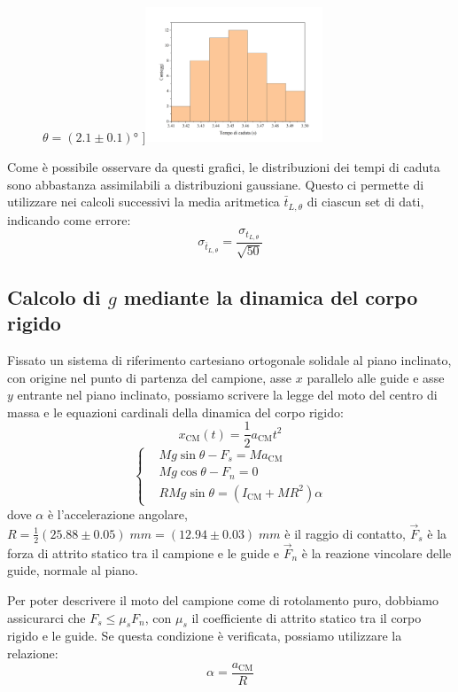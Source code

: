 \documentclass{article}
\begin{document}
\begin{figure}[H]
        $\theta=(2.1\pm0.1)\unit{\degree}$
    ]{\includegraphics[trim={2.1cm 0.7cm 2.1cm 2cm},clip,width=0.47\textwidth]{img/G8.jpg}}\hfil
\end{figure}

Come è possibile osservare da questi grafici, le distribuzioni dei tempi di caduta
sono abbastanza assimilabili a distribuzioni gaussiane.
Questo ci permette di utilizzare nei calcoli successivi la media aritmetica $\bar{t}_{L,\theta}$
di ciascun set di dati, indicando come errore:
\[\sigma_{\bar{t}_{L,\theta}} = \frac{\sigma_{t_{L,\theta}}}{\sqrt{50}}\]

\subsection{Calcolo di $g$ mediante la dinamica del corpo rigido}

Fissato un sistema di riferimento cartesiano ortogonale solidale
al piano inclinato, con origine nel punto di partenza del campione,
asse $x$ parallelo alle guide e asse $y$ entrante nel piano inclinato,
possiamo scrivere la legge del moto del centro di massa e le
equazioni cardinali della dinamica del corpo rigido:
\[x_\text{CM}(t) = \frac{1}{2} a_\text{CM} t^2\]
\[\left\{\begin{aligned}
    &M g \sin\theta - F_s = M a_\text{CM} \\
    &M g \cos\theta - F_n = 0 \\
    &R M g \sin\theta = \left(I_\text{CM} + M R^2\right) \alpha
\end{aligned}\right.\]
dove $\alpha$ è l'accelerazione angolare,
$R = \frac{1}{2}(25.88\pm0.05)\;\unit{mm} = (12.94\pm0.03)\;\unit{mm}$
è il raggio di contatto, $\vec{F}_s$ è la forza di attrito statico
tra il campione e le guide e $\vec{F}_n$ è la reazione vincolare delle
guide, normale al piano.

Per poter descrivere il moto del campione come di rotolamento puro,
dobbiamo assicurarci che $F_s \le \mu_s F_n$, con $\mu_s$ il
coefficiente di attrito statico tra il corpo rigido e le guide.
Se questa condizione è verificata, possiamo utilizzare la relazione:
\[\alpha = \frac{a_\text{CM}}{R}\]
\end{document}
